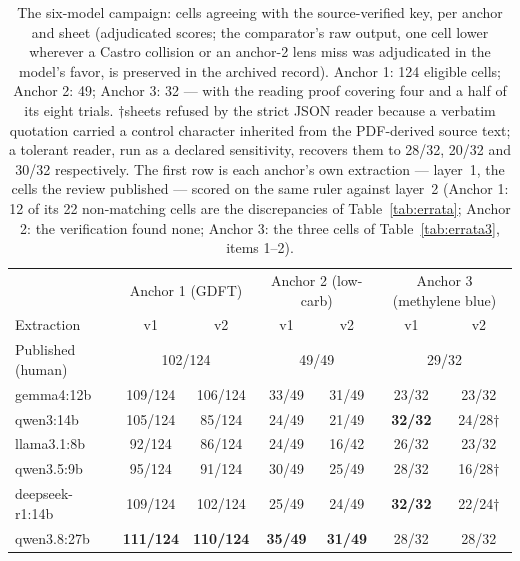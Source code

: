 \documentclass[11pt]{article}
\begin{document}
\begin{table}[H]
\centering\small
\caption{The six-model campaign: cells agreeing with the source-verified key, per anchor and sheet (adjudicated scores; the comparator's raw output, one cell lower wherever a Castro collision or an anchor-2 lens miss was adjudicated in the model's favor, is preserved in the archived record). Anchor 1: 124 eligible cells; Anchor 2: 49; Anchor 3: 32 --- with the reading proof covering four and a half of its eight trials. $\dagger$sheets refused by the strict JSON reader because a verbatim quotation carried a control character inherited from the PDF-derived source text; a tolerant reader, run as a declared sensitivity, recovers them to 28/32, 20/32 and 30/32 respectively. The first row is each anchor's own extraction --- layer~1, the cells the review published --- scored on the same ruler against layer~2 (Anchor 1: 12 of its 22 non-matching cells are the discrepancies of Table~\ref{tab:errata}; Anchor 2: the verification found none; Anchor 3: the three cells of Table~\ref{tab:errata3}, items 1--2).}
\label{tab:s12cells}
\setlength{\tabcolsep}{5pt}
\begin{tabular}{lcccccc}
\toprule
& \multicolumn{2}{c}{Anchor 1 (GDFT)} & \multicolumn{2}{c}{Anchor 2 (low-carb)} & \multicolumn{2}{c}{Anchor 3 (methylene blue)} \\
Extraction & v1 & v2 & v1 & v2 & v1 & v2 \\
\midrule
Published (human) & \multicolumn{2}{c}{102/124} & \multicolumn{2}{c}{49/49} & \multicolumn{2}{c}{29/32} \\
\midrule
gemma4:12b & 109/124 & 106/124 & 33/49 & 31/49 & 23/32 & 23/32 \\
qwen3:14b & 105/124 & 85/124 & 24/49 & 21/49 & \textbf{32/32} & 24/28$\dagger$ \\
llama3.1:8b & 92/124 & 86/124 & 24/49 & 16/42 & 26/32 & 23/32 \\
qwen3.5:9b & 95/124 & 91/124 & 30/49 & 25/49 & 28/32 & 16/28$\dagger$ \\
deepseek-r1:14b & 109/124 & 102/124 & 25/49 & 24/49 & \textbf{32/32} & 22/24$\dagger$ \\
qwen3.8:27b & \textbf{111/124} & \textbf{110/124} & \textbf{35/49} & \textbf{31/49} & 28/32 & 28/32 \\
\bottomrule
\end{tabular}
\end{table}
\end{document}
